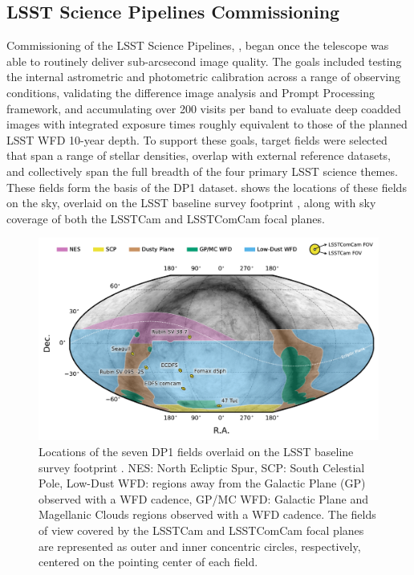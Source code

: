 \subsection{LSST Science Pipelines Commissioning}
\label{ssec:pipelines_commissioning}
Commissioning of the LSST Science Pipelines, \citep{PSTN-019},  began once the telescope was able to routinely deliver sub-arcsecond image quality.
The goals included testing the internal astrometric and photometric calibration across a range of observing conditions,
validating the difference image analysis and Prompt Processing \citep{dmtn-219} framework, and accumulating over 200 visits per band to evaluate
deep coadded images with integrated exposure times roughly equivalent to those of the planned LSST \gls{WFD} 10-year depth.
To support these goals, \nfields target fields were selected that span a range of stellar densities, overlap with external reference datasets, and collectively span the full breadth of the four primary \gls{LSST} science themes.
These \nfields fields form the basis of the \gls{DP1} dataset.
 shows the locations of these \nfields fields on the sky, overlaid on the LSST baseline survey footprint \citep{PSTN-051, PSTN-052, PSTN-053, PSTN-055, PSTN-056}, along with sky coverage of both the LSSTCam and \gls{LSSTComCam} focal planes.
\begin{figure}[bt!]
\centering
\includegraphics[width=\linewidth]{dp1_fields_with_survey_fp}
\caption{Locations of the seven DP1 fields overlaid on the LSST baseline survey footprint \citep{PSTN-056}.
NES: North Ecliptic Spur, SCP: South Celestial Pole, Low-Dust WFD: regions away from the Galactic Plane (GP) observed with a WFD cadence, GP/MC WFD: Galactic Plane and Magellanic Clouds regions observed with a WFD cadence.
The fields of view covered by the LSSTCam and LSSTComCam focal planes are represented as outer and inner concentric circles, respectively, centered on the pointing center of each field.}
\label{fig:dp1_fields_on_sky}
\end{figure}

